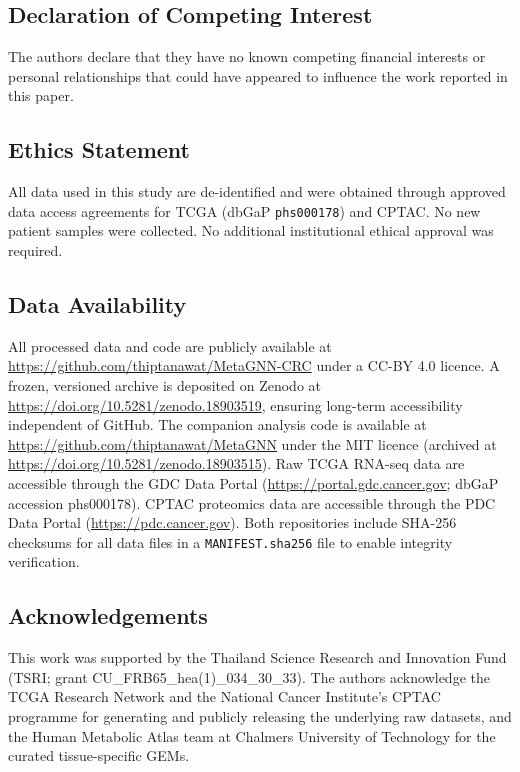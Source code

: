 \documentclass[12pt,a4paper]{article}
\begin{document}
\subsection*{Declaration of Competing Interest}

The authors declare that they have no known competing financial interests or personal relationships that could have appeared to influence the work reported in this paper.

\subsection*{Ethics Statement}

All data used in this study are de-identified and were obtained through approved data access agreements for TCGA (dbGaP \texttt{phs000178}) and CPTAC. No new patient samples were collected. No additional institutional ethical approval was required.

\subsection*{Data Availability}

All processed data and code are publicly available at \url{https://github.com/thiptanawat/MetaGNN-CRC} under a CC-BY 4.0 licence. A frozen, versioned archive is deposited on Zenodo at \url{https://doi.org/10.5281/zenodo.18903519}, ensuring long-term accessibility independent of GitHub. The companion analysis code is available at \url{https://github.com/thiptanawat/MetaGNN} under the MIT licence (archived at \url{https://doi.org/10.5281/zenodo.18903515}). Raw TCGA RNA-seq data are accessible through the GDC Data Portal (\url{https://portal.gdc.cancer.gov}; dbGaP accession phs000178). CPTAC proteomics data are accessible through the PDC Data Portal (\url{https://pdc.cancer.gov}). Both repositories include SHA-256 checksums for all data files in a \texttt{MANIFEST.sha256} file to enable integrity verification.

\subsection*{Acknowledgements}

This work was supported by the Thailand Science Research and Innovation Fund (TSRI; grant CU\_FRB65\_hea(1)\_034\_30\_33). The authors acknowledge the TCGA Research Network and the National Cancer Institute's CPTAC programme for generating and publicly releasing the underlying raw datasets, and the Human Metabolic Atlas team at Chalmers University of Technology for the curated tissue-specific GEMs.
\end{document}
